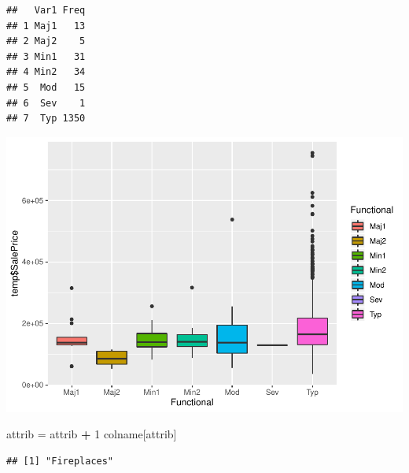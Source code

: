 \documentclass[]{article}
\newenvironment{Shaded}{\begin{snugshade}}{\end{snugshade}}
\newcommand{\DecValTok}[1]{\textcolor[rgb]{0.00,0.00,0.81}{#1}}
\newcommand{\StringTok}[1]{\textcolor[rgb]{0.31,0.60,0.02}{#1}}
\newcommand{\OperatorTok}[1]{\textcolor[rgb]{0.81,0.36,0.00}{\textbf{#1}}}
\newcommand{\NormalTok}[1]{#1}
\begin{document}
\begin{verbatim}
##   Var1 Freq
## 1 Maj1   13
## 2 Maj2    5
## 3 Min1   31
## 4 Min2   34
## 5  Mod   15
## 6  Sev    1
## 7  Typ 1350
\end{verbatim}

\includegraphics{EDA_files/figure-latex/unnamed-chunk-78-1.pdf}

\begin{Shaded}
\begin{Highlighting}[]
\NormalTok{attrib =}\StringTok{ }\NormalTok{attrib }\OperatorTok{+}\StringTok{ }\DecValTok{1}
\NormalTok{colname[attrib]}
\end{Highlighting}
\end{Shaded}

\begin{verbatim}
## [1] "Fireplaces"
\end{verbatim}
\end{document}
